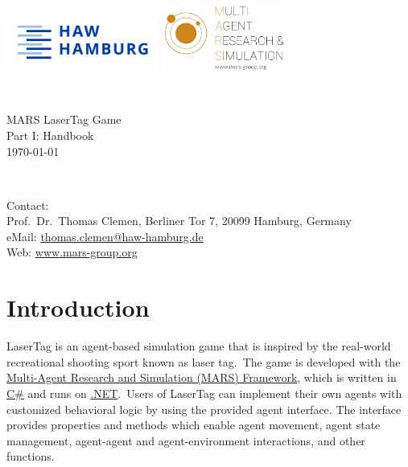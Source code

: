 \documentclass[a4paper,english,DIV=16,11pt,parskip=half,dvipsnames,listof=totoc,index=totoc,bibliography=totoc]{scrartcl}
\begin{document}
\begin{titlepage}

\begin{minipage}{\textwidth}
\noindent
\includegraphics[width=5cm]{../logos/HAW_Hamburg.jpeg}
\hfill
\includegraphics[width=4cm]{../logos/mars_logo.png}
\end{minipage}\\

\vspace{5cm}

\begin{minipage}{\textwidth}
\noindent
\centering
{\huge MARS LaserTag Game}\\[0.5cm]
{\LARGE Part I: Handbook}\\[0.5cm]
{\large \textsf{\today}}
\end{minipage}\\

\vfill

\begin{framed}
	\begin{minipage}{\textwidth}
		Contact:\\ Prof.~Dr.~Thomas Clemen, Berliner Tor 7, 20099 Hamburg, Germany\\
		eMail: \href{mailto:thomas.clemen@haw-hamburg.de}{thomas.clemen@haw-hamburg.de}\\
		Web: \url{www.mars-group.org}
	\end{minipage}

\end{framed}

\end{titlepage}

%
%
\tableofcontents
%
%
\clearpage
%
\section{Introduction}
LaserTag is an agent-based simulation game that is inspired by the real-world recreational shooting sport known as laser tag.~The game is developed with the \href{https://mars-group-haw.github.io/index.html}{Multi-Agent Research and Simulation (MARS) Framework}, which is written in \href{https://learn.microsoft.com/en-us/dotnet/csharp/}{C\#} and runs on \href{https://dotnet.microsoft.com/en-us/download}{.NET}.~Users of LaserTag can implement their own agents with customized behavioral logic by using the provided agent interface. The interface provides properties and methods which enable agent movement, agent state management, agent-agent and agent-environment interactions, and other functions.
%
\end{document}
